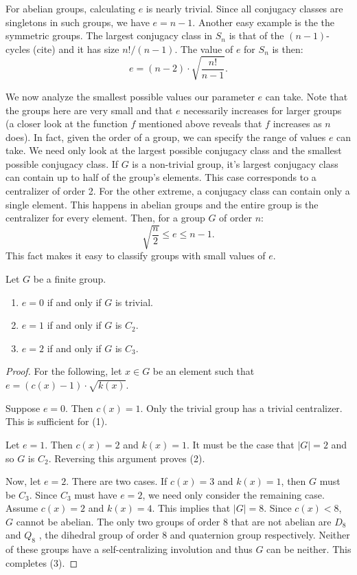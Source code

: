 \documentclass[main.tex]{subfiles}
\begin{document}
For abelian groups, calculating $e$ is nearly trivial. Since all conjugacy classes are singletons in such groups, we have $e = n - 1$. Another easy example is the the symmetric groups. The largest conjugacy class in $S_n$ is that of the $(n-1)$-cycles (cite) and it has size $n!/(n-1)$. The value of $e$ for $S_n$ is then:
$$e = (n - 2) \cdot \sqrt{\frac{n!}{n-1}}\text{.}$$

\hss

We now analyze the smallest possible values our parameter $e$ can take. Note that the groups here are very small and that $e$ necessarily increases for larger groups (a closer look at the function $f$ mentioned above reveals that $f$ increases as $n$ does). In fact, given the order of a group, we can specify the range of values $e$ can take. We need only look at the largest possible conjugacy class and the smallest possible conjugacy class. If $G$ is a non-trivial group, it's largest conjugacy class can contain up to half of the group's elements. This case corresponds to a centralizer of order 2. For the other extreme, a conjugacy class can contain only a single element. This happens in abelian groups and the entire group is the centralizer for every element. Then, for a group $G$ of order $n$:
\begin{equation}\label{erange}
\sqrt{\frac{n}{2}} \le e \le n - 1\text{.}
\end{equation}
This fact makes it easy to classify groups with small values of $e$.

\begin{theorem}\label{easycharacterization}
Let $G$ be a finite group.
\begin{enumerate}
	\item $e = 0$ if and only if $G$ is trivial.
	\item $e = 1$ if and only if $G$ is $C_2$.
	\item $e = 2$ if and only if $G$ is $C_3$.
\end{enumerate}
\end{theorem}

\begin{proof}
For the following, let $x \in G$ be an element such that $e = (c(x) - 1) \cdot \sqrt{k(x)}$.

Suppose $e = 0$. Then $c(x) = 1$. Only the trivial group has a trivial centralizer. This is sufficient for (1).

Let $e = 1$. Then $c(x) = 2$ and $k(x) = 1$. It must be the case that $|G| = 2$ and so $G$ is $C_2$. Reversing this argument proves (2).

Now, let $e = 2$. There are two cases. If $c(x) = 3$ and $k(x) = 1$, then $G$ must be $C_3$. Since $C_3$ must have $e = 2$, we need only consider the remaining case. Assume $c(x) = 2$ and $k(x) = 4$. This implies that $|G| = 8$. Since $c(x) < 8$, $G$ cannot be abelian. The only two groups of order 8 that are not abelian are $D_8$ and $Q_8$ \cite{smallgroups}, the dihedral group of order 8 and quaternion group respectively. Neither of these groups have a self-centralizing involution and thus $G$ can be neither. This completes (3).
\end{proof}
\end{document}
